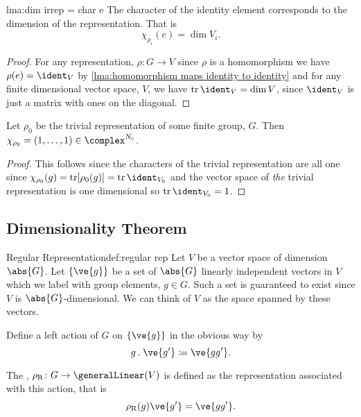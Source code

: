 
\begin{lma}{}{lma:dim irrep = char e}
    The  character of the identity element corresponds to the dimension of
    the representation.
    That is
    \begin{equation}
        \chi_{\rho_i}(e) = \dim V_i.
    \end{equation}
    \begin{proof}
        For any representation, \(\rho \colon G \to V\) since \(\rho\) is a
        homomorphism we have \(\rho(e) = \ident_{V}\) by \cref{lma:homomorphism maps
            identity to identity} and for any finite dimensional vector space, \(V\), we
        have \(\tr\ident_{V} = \dim V\), since \(\ident_V\) is just a matrix with ones
        on the diagonal.
    \end{proof}
\end{lma}

\begin{lma}{}{}
    Let \(\rho_0\) be the trivial representation of some finite group,
    \(G\).
    Then \(\chi_{\rho_0} = (1, \dotsc, 1) \in \complex^{N_{\mathrm{c}}}\).
    \begin{proof}
        This follows since the characters of the trivial representation are
        all one since \(\chi_{\rho_0}(g) = \tr[\rho_0(g)] = \tr\ident_{V_0}\) and the
        vector space of \emph{the} trivial representation is one dimensional so \(\tr
        \ident_{V_0} = 1\).
    \end{proof}
\end{lma}

\subsection{Dimensionality Theorem}
\begin{dfn}{Regular Representation}{def:regular rep}
    Let \(V\) be a vector space of dimension \(\abs{G}\).
    Let \(\{\ve{g}\}\) be a set of \(\abs{G}\) linearly independent vectors
    in \(V\) which we label with group elements, \(g \in G\).
    Such a set is guaranteed to exist since \(V\) is
    \(\abs{G}\)-dimensional.
    We can think of \(V\) as the space spanned by these vectors.
    
    Define a left action of \(G\) on \(\{\ve{g}\}\) in the obvious way by
    \begin{equation}
        g \action \ve{g'} \coloneqq \ve{gg'}.
    \end{equation}
    
    The , \(\rho_{\mathrm{R}} \colon G
    \to \generalLinear(V)\) is defined as the representation associated with this
    action, that is
    \begin{equation}
        \rho_{\mathrm{R}}(g) \ve{g'} = \ve{gg'}.
    \end{equation}
\end{dfn}

